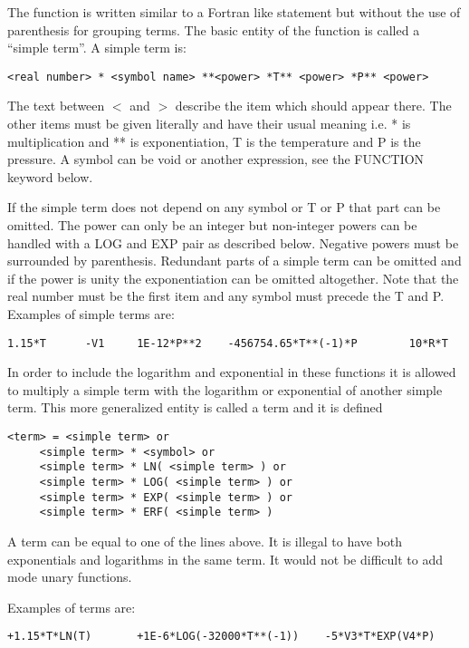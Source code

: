 \documentclass[12pt]{article}
\begin{document}
The function is written similar to a Fortran like statement but
without the use of parenthesis for grouping terms.  The basic entity of
the function is called a ``simple term''.  A simple term is:

\begin{verbatim}
<real number> * <symbol name> **<power> *T** <power> *P** <power>
\end{verbatim}

The text between $<$ and $>$ describe the item which should appear
there.  The other items must be given literally and have their usual
meaning i.e.  * is multiplication and ** is exponentiation, T is the
temperature and P is the pressure.  A symbol can be void or another
expression, see the FUNCTION keyword below.

If the simple term does not depend on any symbol or T or P that part
can be omitted.  The power can only be an integer but non-integer powers
can be handled with a LOG and EXP pair as described below.  Negative
powers must be surrounded by parenthesis.  Redundant parts of a simple
term can be omitted and if the power is unity the exponentiation can
be omitted altogether.  Note that the real number must be the first
item and any symbol must precede the T and P.  Examples of simple terms
are:

\begin{verbatim}
1.15*T      -V1     1E-12*P**2    -456754.65*T**(-1)*P        10*R*T
\end{verbatim}

In order to include the logarithm and exponential in these functions
it is allowed to multiply a simple term with the logarithm or       
exponential of another simple term.  This more generalized entity is 
called a term and it is defined

\begin{verbatim}
<term> = <simple term> or
	 <simple term> * <symbol> or
	 <simple term> * LN( <simple term> ) or
	 <simple term> * LOG( <simple term> ) or
	 <simple term> * EXP( <simple term> ) or
	 <simple term> * ERF( <simple term> )
\end{verbatim}

A term can be equal to one of the lines above.  It is illegal to have
both exponentials and logarithms in the same term.  It would not be
difficult to add mode unary functions.

Examples of terms are:

\begin{verbatim}
+1.15*T*LN(T)       +1E-6*LOG(-32000*T**(-1))    -5*V3*T*EXP(V4*P)
\end{verbatim}
\end{document}
